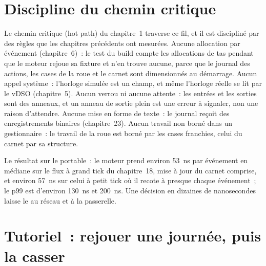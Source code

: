 \section{Discipline du chemin critique}

Le chemin critique (hot path) du chapitre~1 traverse ce fil, et il est discipliné par des règles que les chapitres précédents ont mesurées. Aucune
allocation par événement (chapitre~6)~: le test du build compte les allocations de tas pendant que le moteur rejoue sa fixture et n'en trouve aucune,
parce que le journal des actions, les cases de la roue et le carnet sont dimensionnés au démarrage. Aucun appel système~: l'horloge simulée est un champ,
et même l'horloge réelle se lit par le vDSO (chapitre~5). Aucun verrou ni aucune attente~: les entrées et les sorties sont des anneaux, et un
anneau de sortie plein est une erreur à signaler, non une raison d'attendre. Aucune mise en forme de texte~: le journal reçoit des enregistrements binaires (chapitre~23). Aucun
travail non borné dans un gestionnaire~: le travail de la roue est borné par les cases franchies, celui du carnet par sa structure.

Le résultat sur le portable~: le moteur prend environ \qty{53}{\nano\second} par événement en médiane sur le flux à grand tick du
chapitre~18, mise à jour du carnet comprise, et environ \qty{57}{\nano\second} sur celui à petit tick où il recote à presque chaque
événement~; le p99 est d'environ \qty{130}{\nano\second} et \qty{200}{\nano\second}. Une décision en dizaines de nanosecondes laisse le
 au réseau et à la passerelle.

\section{Tutoriel~: rejouer une journée, puis la casser}\label{tut:ll:the-strategy-engine:tut}

